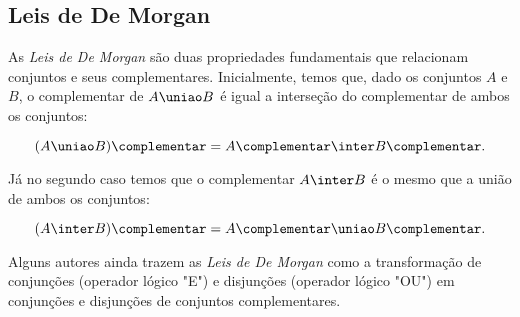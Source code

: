 \subsection{Leis de De Morgan}

As \emph{Leis de De Morgan} são duas propriedades fundamentais que relacionam conjuntos e seus complementares. Inicialmente, temos que, dado os conjuntos $A$ e $B$, o complementar de $A \uniao B$ é igual a interseção do complementar de ambos os conjuntos:

\[
    (A \uniao B)\complementar = A\complementar \inter B\complementar.
\]

Já no segundo caso temos que o complementar $A \inter B$ é o mesmo que a união de ambos os conjuntos:

\[
    (A \inter B)\complementar = A\complementar \uniao B\complementar.
\]


Alguns autores ainda trazem as \emph{Leis de De Morgan} como a transformação de conjunções (operador lógico "E") e disjunções (operador lógico "OU") em conjunções e disjunções de conjuntos complementares.



